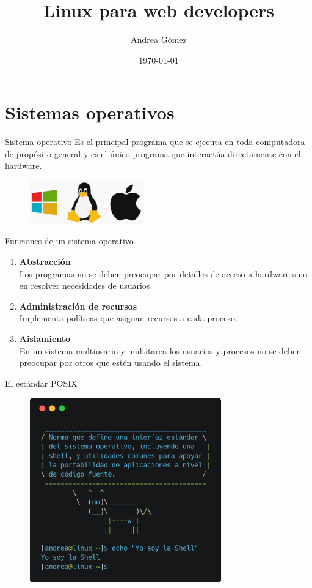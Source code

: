 \documentclass{beamer}
\title{Linux para web developers}
\date{\today}
\author{Andrea Gómez}
\institute{Laboratoria}
\begin{document}
  \maketitle
  \section{Sistemas operativos}

  \begin{frame}{Sistema operativo}
    Es el principal programa que se ejecuta en toda computadora de propósito general y es el único programa que interactúa directamente con el hardware.
    \begin{figure}[ht!]
      \centering
      \includegraphics[width=50mm]{sistemasoperativos.eps}
    \end{figure}
  \end{frame}

  \begin{frame}{Funciones de un sistema operativo}
    \begin{enumerate}
    \item \textbf{Abstracción\\}
      {\small Los programas no se deben preocupar por detalles de acceso a hardware sino en resolver necesidades de usuarios.}
    \item \textbf{Administración de recursos\\}
      {\small Implementa políticas que asignan recursos a cada proceso.}
    \item \textbf{Aislamiento\\}
      {\small En un sistema multiusario y multitarea los usuarios y procesos no se deben preocupar por otros que estén usando el sistema.}
    \end{enumerate}
  \end{frame}

  \begin{frame}{El estándar POSIX}
    \begin{figure}[ht!]
      \centering
      \includegraphics[height=80mm]{shell.eps}
    \end{figure}
  \end{frame}
\end{document}
